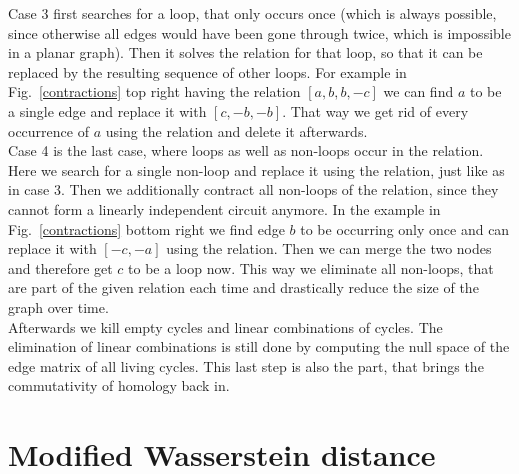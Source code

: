 \documentclass[11pt, a4paper, UKenglish]{article}
\begin{document}
    Case 3 first searches for a loop, that only occurs once (which is always possible, since otherwise all edges would have been gone through twice, which is impossible in a planar graph).
    Then it solves the relation for that loop, so that it can be replaced by the resulting sequence of other loops.
    For example in Fig.\ \ref{contractions} top right having the relation $[a, b, b, -c]$ we can find $a$ to be a single edge and replace it with $[c, -b, -b]$.
    That way we get rid of every occurrence of $a$ using the relation and delete it afterwards.\\
    Case 4 is the last case, where loops as well as non-loops occur in the relation.
    Here we search for a single non-loop and replace it using the relation, just like as in case 3.
    Then we additionally contract all non-loops of the relation, since they cannot form a linearly independent circuit anymore.
    In the example in Fig.\ \ref{contractions} bottom right we find edge $b$ to be occurring only once and can replace it with $[-c, -a]$ using the relation.
    Then we can merge the two nodes and therefore get $c$ to be a loop now.
    This way we eliminate all non-loops, that are part of the given relation each time and drastically reduce the size of the graph over time.\\
    Afterwards we kill empty cycles and linear combinations of cycles.
    The elimination of linear combinations is still done by computing the null space of the edge matrix of all living cycles.
    This last step is also the part, that brings the commutativity of homology back in.
    

    \section{Modified Wasserstein distance}\label{sec:distance-measures}
\end{document}
